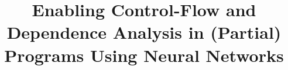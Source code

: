 \documentclass[conference]{IEEEtran}
\begin{document}
\title{Enabling Control-Flow and Dependence Analysis in (Partial) Programs Using Neural Networks}



\maketitle
\end{document}

